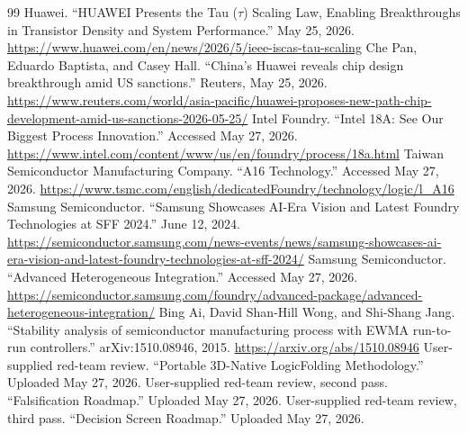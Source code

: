 \documentclass[11pt]{article}
\begin{document}
\clearpage
\begin{thebibliography}{99}
 Huawei. ``HUAWEI Presents the Tau ($\tau$) Scaling Law, Enabling Breakthroughs in Transistor Density and System Performance.'' May 25, 2026. \url{https://www.huawei.com/en/news/2026/5/ieee-iscas-tau-scaling}
 Che Pan, Eduardo Baptista, and Casey Hall. ``China's Huawei reveals chip design breakthrough amid US sanctions.'' Reuters, May 25, 2026. \url{https://www.reuters.com/world/asia-pacific/huawei-proposes-new-path-chip-development-amid-us-sanctions-2026-05-25/}
 Intel Foundry. ``Intel 18A: See Our Biggest Process Innovation.'' Accessed May 27, 2026. \url{https://www.intel.com/content/www/us/en/foundry/process/18a.html}
 Taiwan Semiconductor Manufacturing Company. ``A16 Technology.'' Accessed May 27, 2026. \url{https://www.tsmc.com/english/dedicatedFoundry/technology/logic/l_A16}
 Samsung Semiconductor. ``Samsung Showcases AI-Era Vision and Latest Foundry Technologies at SFF 2024.'' June 12, 2024. \url{https://semiconductor.samsung.com/news-events/news/samsung-showcases-ai-era-vision-and-latest-foundry-technologies-at-sff-2024/}
 Samsung Semiconductor. ``Advanced Heterogeneous Integration.'' Accessed May 27, 2026. \url{https://semiconductor.samsung.com/foundry/advanced-package/advanced-heterogeneous-integration/}
 Bing Ai, David Shan-Hill Wong, and Shi-Shang Jang. ``Stability analysis of semiconductor manufacturing process with EWMA run-to-run controllers.'' arXiv:1510.08946, 2015. \url{https://arxiv.org/abs/1510.08946}
 User-supplied red-team review. ``Portable 3D-Native LogicFolding Methodology.'' Uploaded May 27, 2026.
 User-supplied red-team review, second pass. ``Falsification Roadmap.'' Uploaded May 27, 2026.
 User-supplied red-team review, third pass. ``Decision Screen Roadmap.'' Uploaded May 27, 2026.
\end{thebibliography}
\end{document}
